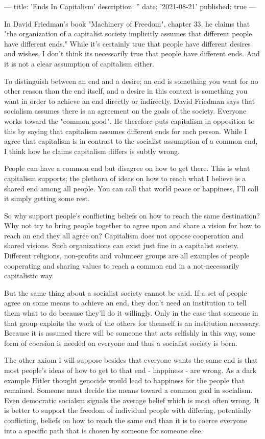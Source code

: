 ---
title: 'Ends In Capitalism'
description: ''
date: '2021-08-21'
published: true
---

In David Friedman's book "Machinery of Freedom", chapter 33, he claims that "the organization of a capitalist society implicitly assumes that different people have different ends." While it's certainly true that people have different desires and wishes, I don't think its necessarily true that people have different ends. And it is not a clear assumption of capitalism either.

To distinguish between an end and a desire; an end is something you want for no other reason than the end itself, and a desire in this context is something you want in order to achieve an end directly or indirectly. David Friedman says that socialism assumes there is an agreement on the goals of the society. Everyone works toward the "common good". He therefore puts capitalism in opposition to this by saying that capitalism assumes different ends for each person. While I agree that capitalism is in contrast to the socialist assumption of a common end, I think how he claims capitalism differs is subtly wrong.

People can have a common end but disagree on how to get there. This is what capitalism supports; the plethora of ideas on how to reach what I believe is a shared end among all people. You can call that world peace or happiness, I'll call it simply getting some rest.

So why support people's conflicting beliefs on how to reach the same destination? Why not try to bring people together to agree upon and share a vision for how to reach an end they all agree on? Capitalism does not oppose cooperation and shared visions. Such organizations can exist just fine in a capitalist society. Different religions, non-profits and volunteer groups are all examples of people cooperating and sharing values to reach a common end in a not-necessarily capitalistic way.

But the same thing about a socialist society cannot be said. If a set of people agree on some means to achieve an end, they don't need an institution to tell them what to do because they'll do it willingly. Only in the case that someone in that group exploits the work of the others for themself is an institution necessary. Because it is assumed there will be someone that acts selfishly in this way, some form of coersion is needed on everyone and thus a socialist society is born.

The other axiom I will suppose besides that everyone wants the same end is that most people's ideas of how to get to that end - happiness - are wrong. As a dark example Hitler thought genocide would lead to happiness for the people that remained. Someone must decide the means toward a common goal in socialism. Even democratic socialsm signals the average belief which is most often wrong. It is better to support the freedom of individual people with differing, potentially conflicting, beliefs on how to reach the same end than it is to coerce everyone into a specific path that is chosen by someone for someone else.

